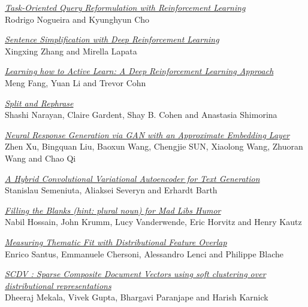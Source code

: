 \hyperlink{page.583}{\em Task-Oriented Query Reformulation with Reinforcement Learning}\samepage \\
\hspace*{7mm} Rodrigo Nogueira and Kyunghyun Cho\dotfill {}

\hyperlink{page.593}{\em Sentence Simplification with Deep Reinforcement Learning}\samepage \\
\hspace*{7mm} Xingxing Zhang and Mirella Lapata\dotfill {}

\hyperlink{page.604}{\em Learning how to Active Learn: A Deep Reinforcement Learning Approach}\samepage \\
\hspace*{7mm} Meng Fang, Yuan Li and Trevor Cohn\dotfill {}

\hyperlink{page.615}{\em Split and Rephrase}\samepage \\
\hspace*{7mm} Shashi Narayan, Claire Gardent, Shay B. Cohen and Anastasia Shimorina\dotfill {}

\hyperlink{page.626}{\em Neural Response Generation via GAN with an Approximate Embedding Layer}\samepage \\
\hspace*{7mm} Zhen Xu, Bingquan Liu, Baoxun Wang, Chengjie SUN, Xiaolong Wang, Zhuoran Wang and Chao Qi\dotfill {}

\hyperlink{page.636}{\em A Hybrid Convolutional Variational Autoencoder for Text Generation}\samepage \\
\hspace*{7mm} Stanislau Semeniuta, Aliaksei Severyn and Erhardt Barth\dotfill {}

\hyperlink{page.647}{\em Filling the Blanks (hint: plural noun) for Mad Libs Humor}\samepage \\
\hspace*{7mm} Nabil Hossain, John Krumm, Lucy Vanderwende, Eric Horvitz and Henry Kautz\dotfill {}

\hyperlink{page.657}{\em Measuring Thematic Fit with Distributional Feature Overlap}\samepage \\
\hspace*{7mm} Enrico Santus, Emmanuele Chersoni, Alessandro Lenci and Philippe Blache\dotfill {}

\hyperlink{page.668}{\em SCDV : Sparse Composite Document Vectors using soft clustering over distributional representations}\samepage \\
\hspace*{7mm} Dheeraj Mekala, Vivek Gupta, Bhargavi Paranjape and Harish Karnick\dotfill {}

